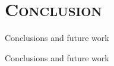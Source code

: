 \documentclass[xcolor=x11names,compress]{beamer}
\begin{document}
\section{\scshape Conclusion}

{
\begin{frame}[t]{Conclusions and future work}
    
\end{frame}}

{
\begin{frame}[t]{Conclusions and future work}
    
    
\end{frame}}
\end{document}
